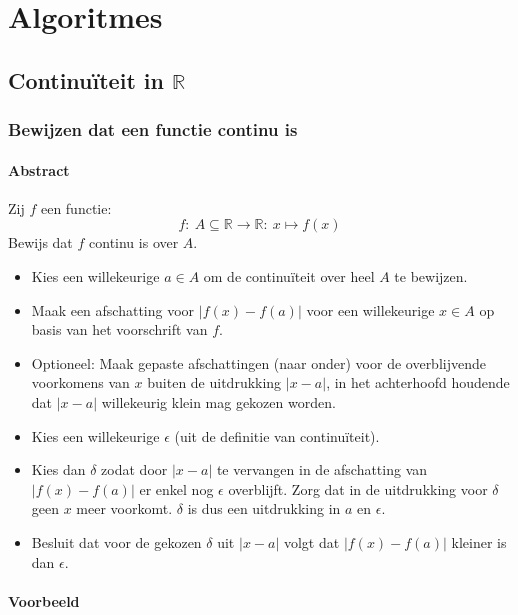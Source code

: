 \documentclass[main.tex]{subfiles}
\begin{document}
\chapter{Algoritmes}
\label{cha:algoritmes}

\section{Continu\"iteit in $\mathbb{R}$}
\label{sec:continuiteit-mathbbr}

\subsection{Bewijzen dat een functie continu is}
\label{sec:bewijzen-dat-een}

\subsubsection{Abstract}
\label{sec:abstract}

Zij $f$ een functie:
\[ f:\ A \subseteq \mathbb{R} \rightarrow \mathbb{R}:\ x \mapsto f(x) \]
Bewijs dat $f$ continu is over $A$.

\begin{itemize}
\item Kies een willekeurige $a \in A$ om de continu\"iteit over heel $A$ te bewijzen.\needed
\item Maak een afschatting voor $|f(x)-f(a)|$ voor een willekeurige $x \in A$ op basis van het voorschrift van $f$.
\item Optioneel: Maak gepaste afschattingen (naar onder) voor de overblijvende voorkomens van $x$ buiten de uitdrukking $|x-a|$, in het achterhoofd houdende dat $|x-a|$ willekeurig klein mag gekozen worden.
\item Kies een willekeurige $\epsilon$ (uit de definitie van continu\"iteit).
\item Kies dan $\delta$ zodat door $|x-a|$ te vervangen in de afschatting van $|f(x)-f(a)|$ er enkel nog $\epsilon$ overblijft. Zorg dat in de uitdrukking voor $\delta$ geen $x$ meer voorkomt.
$\delta$ is dus een uitdrukking in $a$ en $\epsilon$.
\item Besluit dat voor de gekozen $\delta$ uit $|x-a|$ volgt dat $|f(x)-f(a)|$ kleiner is dan $\epsilon$.
\end{itemize}

\subsubsection{Voorbeeld}
\label{sec:voorbeeld}
\end{document}
